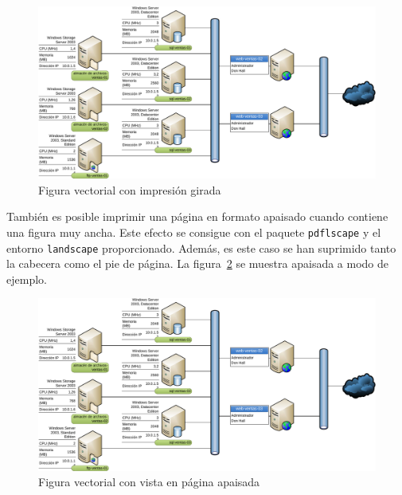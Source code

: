\begin{figure}
	\centering
	\includegraphics[width=0.98\textheight]{./figs/network} 
	\caption[Gráfico girado]{Figura vectorial con impresión girada}
	\label{fig:girada}
\end{figure}


\begin{landscape}
\thispagestyle{empty}
También es posible imprimir una página en formato apaisado cuando contiene una figura muy ancha. Este efecto se consigue con el paquete \texttt{pdflscape} y el entorno \texttt{landscape} proporcionado. Además, es este caso se han suprimido tanto la cabecera como el pie de página. La figura~\ref{fig:apaisada} se muestra apaisada a modo de ejemplo.

\begin{figure}[H]
	\centering
	\includegraphics[width=\linewidth]{./figs/network} 
	\caption[Gráfico apaisado]{Figura vectorial con vista en página apaisada}
	\label{fig:apaisada}
\end{figure}
\end{landscape}


